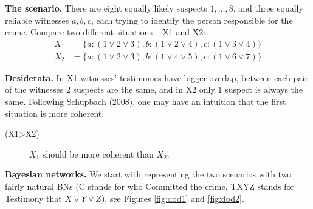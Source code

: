 \documentclass[
  10pt,
]{scrartcl}
\newcommand{\s}[1]{\textsf{#1}}
\begin{document}
\textbf{The scenario.} There are eight equally likely suspects \(1, \dots, 8\), and three equally reliable witnesses \(a, b, c\), each trying to identify the person responsible for the crime. Compare two different situations -- \s{X1} and \s{X2}:
\begin{align*}
    X_1 & = \{a:(1 \vee 2 \vee 3), b:(1\vee 2 \vee 4), c:(1 \vee 3 \vee 4)\}\\
    X_2 & =  \{a:(1 \vee 2 \vee 3), b:(1\vee  4 \vee 5), c:(1 \vee 6 \vee 7)\}
\end{align*}

\noindent \textbf{Desiderata.} In \s{X1} witnesses' testimonies have bigger overlap, between each pair of the witnesses 2 suspects are the same, and in \s{X2} only 1 suspect is always the same. Following Schupbach (2008), one may have an intuition that the first situation is more coherent.
\vspace{2mm}

\begin{description}
    \item[(\s{X1\textgreater X2})] $X_1$  should be more coherent than $X_2$.
\end{description}\vspace{2mm}

\noindent \textbf{Bayesian networks.} We start with representing the two scenarios with two fairly natural BNs (\textsf{C} stands for who Committed the crime, \textsf{TXYZ} stands for Testimony that \(X\vee Y \vee Z\)), see Figures \ref{fig:dod1} and \ref{fig:dod2}.
\end{document}

